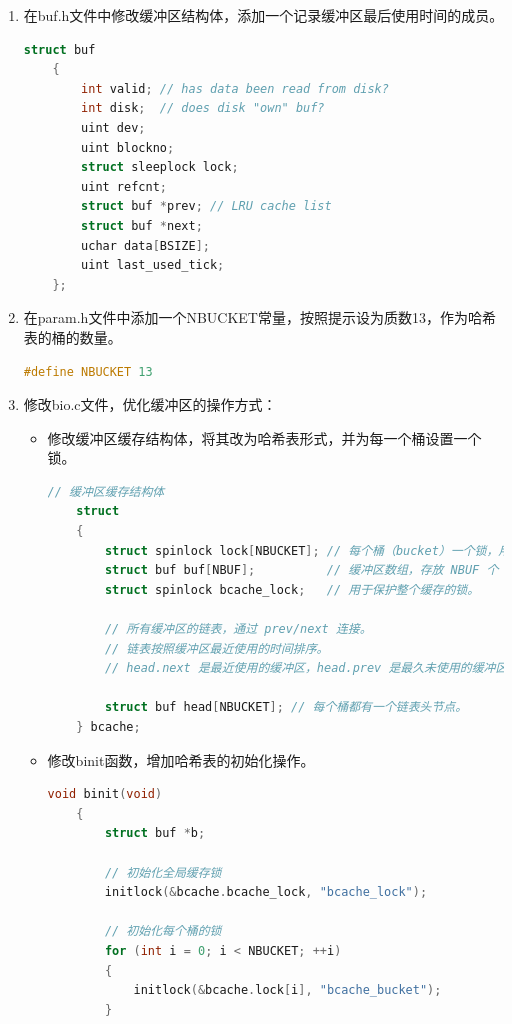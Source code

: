 \begin{enumerate}
    \item 在buf.h文件中修改缓冲区结构体，添加一个记录缓冲区最后使用时间的成员。
          \begin{lstlisting}[language=c,title=buf.h的修改]
    struct buf
    {
        int valid; // has data been read from disk?
        int disk;  // does disk "own" buf?
        uint dev;
        uint blockno;
        struct sleeplock lock;
        uint refcnt;
        struct buf *prev; // LRU cache list
        struct buf *next;
        uchar data[BSIZE];
        uint last_used_tick;
    };
    \end{lstlisting}
    \item 在param.h文件中添加一个NBUCKET常量，按照提示设为质数13，作为哈希表的桶的数量。
          \begin{lstlisting}[language=c,title=添加常量]
    #define NBUCKET 13
        \end{lstlisting}
    \item 修改bio.c文件，优化缓冲区的操作方式：
          \begin{itemize}
              \item 修改缓冲区缓存结构体，将其改为哈希表形式，并为每一个桶设置一个锁。
                    \begin{lstlisting}[language=c,title=对缓冲区缓存结构体的修改]
    // 缓冲区缓存结构体
    struct
    {
        struct spinlock lock[NBUCKET]; // 每个桶（bucket）一个锁，用于保护桶中的缓冲区链表。
        struct buf buf[NBUF];          // 缓冲区数组，存放 NBUF 个 buf 结构体。
        struct spinlock bcache_lock;   // 用于保护整个缓存的锁。
    
        // 所有缓冲区的链表，通过 prev/next 连接。
        // 链表按照缓冲区最近使用的时间排序。
        // head.next 是最近使用的缓冲区，head.prev 是最久未使用的缓冲区。
    
        struct buf head[NBUCKET]; // 每个桶都有一个链表头节点。
    } bcache;
              \end{lstlisting}
              \item 修改binit函数，增加哈希表的初始化操作。
                    \newpage
                    \begin{lstlisting}[language=c,title=对binit函数的修改]
    void binit(void)
    {
        struct buf *b;

        // 初始化全局缓存锁
        initlock(&bcache.bcache_lock, "bcache_lock");

        // 初始化每个桶的锁
        for (int i = 0; i < NBUCKET; ++i)
        {
            initlock(&bcache.lock[i], "bcache_bucket");
        }


\end{lstlisting}
\end{itemize}
\end{enumerate}
